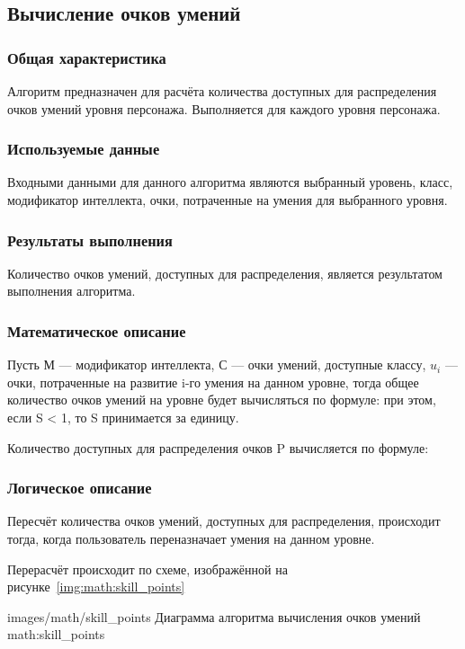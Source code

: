 \subsection{Вычисление очков умений}

\subsubsection{Общая характеристика}

Алгоритм предназначен для расчёта количества доступных для распределения очков умений уровня персонажа. Выполняется для каждого уровня персонажа.

\subsubsection{Используемые данные}

Входными данными для данного алгоритма являются выбранный уровень, класс, модификатор интеллекта, очки, потраченные на умения для выбранного уровня.

\subsubsection{Результаты выполнения}

Количество очков умений, доступных для распределения, является результатом выполнения алгоритма.

\subsubsection{Математическое описание}

Пусть $М$ --- модификатор интеллекта, $С$ --- очки умений, доступные классу, $u_i$ --- очки, потраченные на развитие i-го умения на данном уровне, тогда общее количество очков умений на уровне будет вычисляться по формуле:
при этом, если S < 1, то S принимается за единицу.

Количество доступных для распределения очков P вычисляется по формуле:

\subsubsection{Логическое описание}

Пересчёт количества очков умений, доступных для распределения, происходит тогда, когда пользователь переназначает умения на данном уровне.

Перерасчёт происходит по схеме, изображённой на рисунке~\ref{img:math:skill_points}

            {images/math/skill_points}
            {Диаграмма алгоритма вычисления очков умений}
            {math:skill_points}
